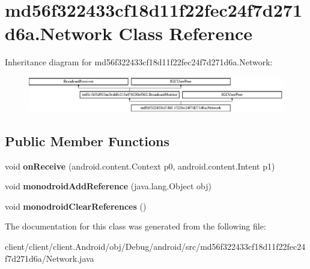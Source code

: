 \hypertarget{classmd56f322433cf18d11f22fec24f7d271d6a_1_1Network}{}\section{md56f322433cf18d11f22fec24f7d271d6a.\+Network Class Reference}
\label{classmd56f322433cf18d11f22fec24f7d271d6a_1_1Network}
Inheritance diagram for md56f322433cf18d11f22fec24f7d271d6a.\+Network\+:\begin{figure}[H]
\begin{center}
\leavevmode
\includegraphics[height=1.559889cm]{classmd56f322433cf18d11f22fec24f7d271d6a_1_1Network}
\end{center}
\end{figure}
\subsection*{Public Member Functions}
\begin{DoxyCompactItemize}
\item 
\hypertarget{classmd56f322433cf18d11f22fec24f7d271d6a_1_1Network_ab8513123e9f0346327429efe0bf76ecc}{}void {\bfseries on\+Receive} (android.\+content.\+Context p0, android.\+content.\+Intent p1)\label{classmd56f322433cf18d11f22fec24f7d271d6a_1_1Network_ab8513123e9f0346327429efe0bf76ecc}

\item 
\hypertarget{classmd56f322433cf18d11f22fec24f7d271d6a_1_1Network_ac4080d5f8f84bf094a52289f9af44a14}{}void {\bfseries monodroid\+Add\+Reference} (java.\+lang.\+Object obj)\label{classmd56f322433cf18d11f22fec24f7d271d6a_1_1Network_ac4080d5f8f84bf094a52289f9af44a14}

\item 
\hypertarget{classmd56f322433cf18d11f22fec24f7d271d6a_1_1Network_af19ef7f887d598c98826b653a238d7f6}{}void {\bfseries monodroid\+Clear\+References} ()\label{classmd56f322433cf18d11f22fec24f7d271d6a_1_1Network_af19ef7f887d598c98826b653a238d7f6}

\end{DoxyCompactItemize}


The documentation for this class was generated from the following file\+:\begin{DoxyCompactItemize}
\item 
client/client/client.\+Android/obj/\+Debug/android/src/md56f322433cf18d11f22fec24f7d271d6a/Network.\+java\end{DoxyCompactItemize}

